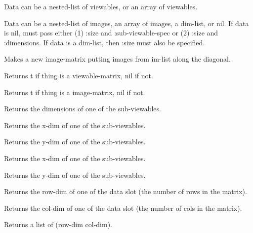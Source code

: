 \begin{description}
\item{}
Data can be a nested-list of viewables, or an array of viewables.

\item{}
Data can be a nested-list of images, an array of images, a dim-list, or
nil.  If data is nil, must pass either (1) :size and
:sub-viewable-spec or (2) :size and :dimensions.  If data is a
dim-list, then :size must also be specified.

\item{}
Makes a new image-matrix putting images from im-list along the diagonal.

\item{}
Returns t if thing is a viewable-matrix, nil if not.

\item{}
Returns t if thing is a image-matrix, nil if not.

\item{}
Returns the dimensions of one of the sub-viewables.

\item{}
Returns the x-dim of one of the sub-viewables.

\item{}
Returns the y-dim of one of the sub-viewables.

\item{}
Returns the x-dim of one of the sub-viewables.

\item{}
Returns the y-dim of one of the sub-viewables.

\item{}
Returns the row-dim of one of the data slot (the number of rows in the
matrix).

\item{}
Returns the col-dim of one of the data slot (the number of cols in the
matrix).

\item{}
Returns a list of (row-dim col-dim).


\end{description}
